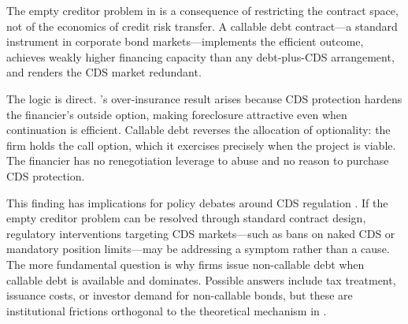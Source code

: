 \documentclass[12pt,a4paper]{article}
\theoremstyle{plain}
\theoremstyle{definition}
\theoremstyle{remark}
\begin{document}
The empty creditor problem in \citet{boltonoehmke2011} is a consequence of restricting the contract space, not of the economics of credit risk transfer. A callable debt contract---a standard instrument in corporate bond markets---implements the efficient outcome, achieves weakly higher financing capacity than any debt-plus-CDS arrangement, and renders the CDS market redundant.

The logic is direct. \citeauthor{boltonoehmke2011}'s over-insurance result arises because CDS protection hardens the financier's outside option, making foreclosure attractive even when continuation is efficient. Callable debt reverses the allocation of optionality: the firm holds the call option, which it exercises precisely when the project is viable. The financier has no renegotiation leverage to abuse and no reason to purchase CDS protection.

This finding has implications for policy debates around CDS regulation \citep{hu2009, duffie2010}. If the empty creditor problem can be resolved through standard contract design, regulatory interventions targeting CDS markets---such as bans on naked CDS or mandatory position limits---may be addressing a symptom rather than a cause. The more fundamental question is why firms issue non-callable debt when callable debt is available and dominates. Possible answers include tax treatment, issuance costs, or investor demand for non-callable bonds, but these are institutional frictions orthogonal to the theoretical mechanism in \citet{boltonoehmke2011}.



\end{document}
